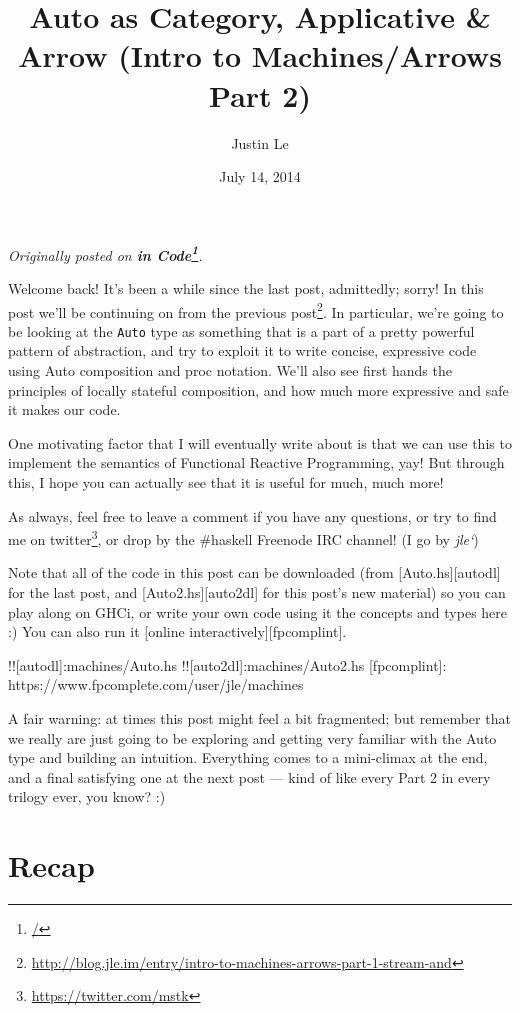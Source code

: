 \documentclass[]{article}
\title{Auto as Category, Applicative \& Arrow (Intro to Machines/Arrows Part 2)}
\author{Justin Le}
\date{July 14, 2014}
\renewcommand{\href}[2]{#2\footnote{\url{#1}}}
\begin{document}
\maketitle

\emph{Originally posted on \textbf{\href{/}{in Code}}.}

Welcome back! It's been a while since the last post, admittedly; sorry!
In this post we'll be continuing on from
\href{http://blog.jle.im/entry/intro-to-machines-arrows-part-1-stream-and}{the
previous post}. In particular, we're going to be looking at the
\texttt{Auto} type as something that is a part of a pretty powerful
pattern of abstraction, and try to exploit it to write concise,
expressive code using Auto composition and proc notation. We'll also see
first hands the principles of locally stateful composition, and how much
more expressive and safe it makes our code.

One motivating factor that I will eventually write about is that we can
use this to implement the semantics of Functional Reactive Programming,
yay! But through this, I hope you can actually see that it is useful for
much, much more!

As always, feel free to leave a comment if you have any questions, or
try to find me on \href{https://twitter.com/mstk}{twitter}, or drop by
the \#haskell Freenode IRC channel! (I go by \emph{jle`})

Note that all of the code in this post can be downloaded (from
{[}Auto.hs{]}{[}autodl{]} for the last post, and
{[}Auto2.hs{]}{[}auto2dl{]} for this post's new material) so you can
play along on GHCi, or write your own code using it the concepts and
types here :) You can also run it {[}online
interactively{]}{[}fpcomplint{]}.

!!{[}autodl{]}:machines/Auto.hs !!{[}auto2dl{]}:machines/Auto2.hs
{[}fpcomplint{]}: https://www.fpcomplete.com/user/jle/machines

A fair warning: at times this post might feel a bit fragmented; but
remember that we really are just going to be exploring and getting very
familiar with the Auto type and building an intuition. Everything comes
to a mini-climax at the end, and a final satisfying one at the next post
--- kind of like every Part 2 in every trilogy ever, you know? :)

\section{Recap}\label{recap}
\end{document}
